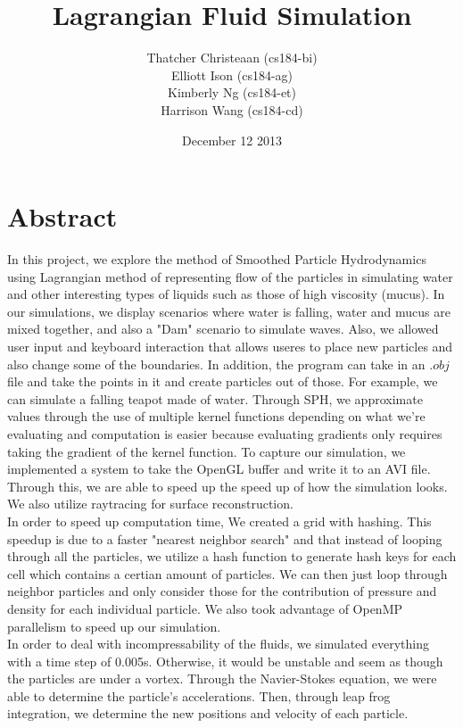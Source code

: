 \documentclass{article}
\title{\textbf{Lagrangian Fluid Simulation}}
\author{Thatcher Christeaan (cs184-bi)\\
       Elliott Ison (cs184-ag)\\
       Kimberly Ng (cs184-et)\\
       Harrison Wang (cs184-cd)\\}
\date{December 12 2013}
\begin{document}
\maketitle

\section{Abstract}
 In this project, we explore the method of Smoothed Particle Hydrodynamics using Lagrangian method of representing flow of the particles in simulating water and other interesting types of liquids such as those of high viscosity (mucus). In our simulations, we display scenarios where water is falling, water and mucus are mixed together, and also a "Dam" scenario to simulate waves. Also, we allowed user input and keyboard interaction that allows useres to place new particles and also change some of the boundaries. In addition, the program can take in an $.obj$ file and take the points in it and create particles out of those. For example, we can simulate a falling teapot made of water. Through SPH, we approximate values through the use of multiple kernel functions depending on what we're evaluating and computation is easier because evaluating gradients only requires taking the gradient of the kernel function. To capture our simulation, we implemented a system to take the OpenGL buffer and write it to an AVI file. Through this, we are able to speed up the speed up of how the simulation looks. We also utilize raytracing for surface reconstruction.\\
 
  In order to speed up computation time, We created a grid with hashing. This speedup is due to a faster "nearest neighbor search" and that instead of looping through all the particles, we utilize a hash function to generate hash keys for each cell which contains a certian amount of particles. We can then just loop through neighbor particles and only consider those for the contribution of pressure and density for each individual particle. We also took advantage of OpenMP parallelism to speed up our simulation.\\
  
  In order to deal with incompressability of the fluids, we simulated
  everything with a time step of 0.005s. Otherwise, it would be unstable and seem as though the particles are under a vortex. Through the Navier-Stokes equation, we were able to determine the particle's accelerations. Then, through leap frog integration, we determine the new positions and velocity of each particle. 
\end{document}
